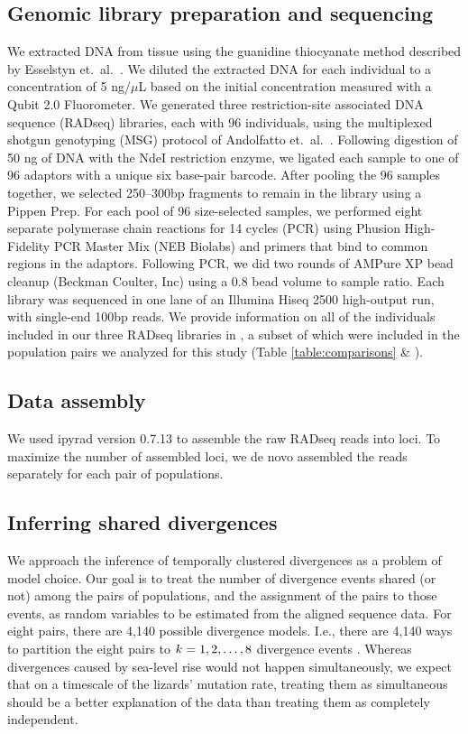 \subsection{Genomic library preparation and sequencing}

We extracted DNA from tissue using the guanidine thiocyanate method described
by Esselstyn et.\ al.\ \citeyear{Esselstyn2008}.
We diluted the extracted DNA for each individual to a concentration of 5
ng/$\mu$L based on the initial concentration measured with a Qubit 2.0
Fluorometer.
We generated three restriction-site associated DNA sequence (RADseq) libraries,
each with 96 individuals, using the multiplexed shotgun genotyping (MSG)
protocol of Andolfatto et.\ al.\ \citep{Andolfatto2011}.
Following digestion of 50 ng of DNA with the NdeI restriction enzyme, we
ligated each sample to one of 96 adaptors with a unique six base-pair barcode.
After pooling the 96 samples together, we selected 250--300bp fragments to
remain in the library using a Pippen Prep.
For each pool of 96 size-selected samples, we performed eight separate
polymerase chain reactions for 14 cycles (PCR) using Phusion High-Fidelity PCR
Master Mix (NEB Biolabs) and primers that bind to common regions in the
adaptors.
Following PCR, we did two rounds of AMPure XP bead cleanup (Beckman Coulter,
Inc) using a 0.8 bead volume to sample ratio.
Each library was sequenced in one lane of an Illumina Hiseq 2500 high-output
run, with single-end 100bp reads.
We provide information on all of the individuals included in our three RADseq
libraries in , a subset of which were included in the
population pairs we analyzed for this study (Table \ref{table:comparisons} \&
).

\subsection{Data assembly}
We used ipyrad version 0.7.13 \citep{ipyrad0713} to assemble the raw RADseq
reads into loci.
To maximize the number of assembled loci, we de novo assembled the reads
separately for each pair of populations.

\subsection{Inferring shared divergences}
We approach the inference of temporally clustered divergences as a problem of
model choice.
Our goal is to treat the number of divergence events shared (or not) among the
pairs of populations, and the assignment of the pairs to those events, as
random variables to be estimated from the aligned sequence data.
For eight pairs, there are 4,140 possible divergence models.
I.e., there are 4,140 ways to partition the eight pairs to $k_{} = 1, 2,
\ldots, 8$ divergence events \citep{Bell1934,Oaks2014dpp,Oaks2018ecoevolity}.
Whereas divergences caused by sea-level rise would not happen simultaneously,
we expect that on a timescale of the lizards' mutation rate, treating them as
simultaneous should be a better explanation of the data than treating them as
completely independent.

